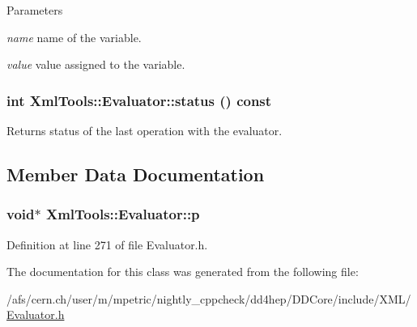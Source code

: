 \begin{DoxyParams}{Parameters}
\item[{\em name}]name of the variable. \item[{\em value}]value assigned to the variable. \end{DoxyParams}
\hypertarget{class_xml_tools_1_1_evaluator_a2bb48b05d692c7b2f32d7ef8996ef835}{
\subsubsection[{status}]{\setlength{\rightskip}{0pt plus 5cm}int XmlTools::Evaluator::status () const}}
\label{class_xml_tools_1_1_evaluator_a2bb48b05d692c7b2f32d7ef8996ef835}
Returns status of the last operation with the evaluator. 

\subsection{Member Data Documentation}
\hypertarget{class_xml_tools_1_1_evaluator_aa7c19df1b96202c09024f7b7f4942364}{
\subsubsection[{p}]{\setlength{\rightskip}{0pt plus 5cm}void$\ast$ {\bf XmlTools::Evaluator::p}}}
\label{class_xml_tools_1_1_evaluator_aa7c19df1b96202c09024f7b7f4942364}


Definition at line 271 of file Evaluator.h.

The documentation for this class was generated from the following file:\begin{DoxyCompactItemize}
\item 
/afs/cern.ch/user/m/mpetric/nightly\_\-cppcheck/dd4hep/DDCore/include/XML/\hyperlink{_evaluator_8h}{Evaluator.h}\end{DoxyCompactItemize}
